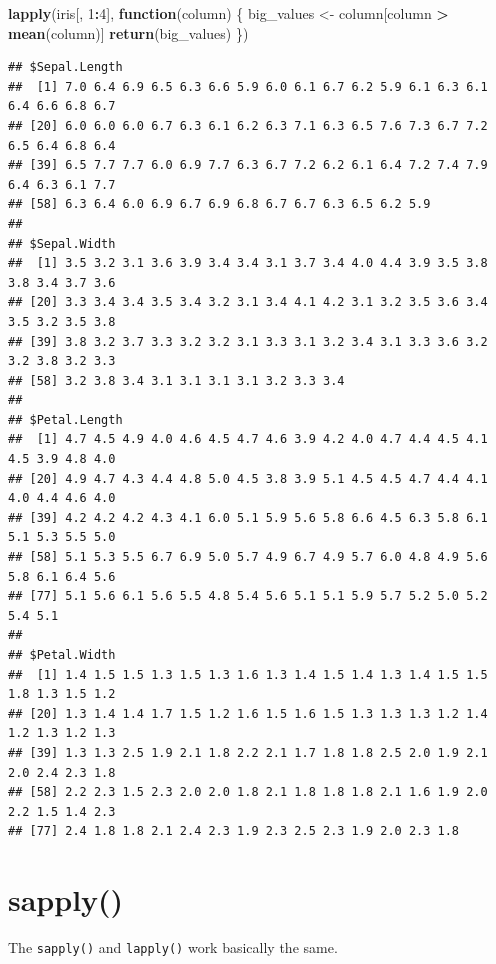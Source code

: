 \documentclass[
]{book}
\newenvironment{Shaded}{\begin{snugshade}}{\end{snugshade}}
\newcommand{\ControlFlowTok}[1]{\textcolor[rgb]{0.13,0.29,0.53}{\textbf{#1}}}
\newcommand{\DecValTok}[1]{\textcolor[rgb]{0.00,0.00,0.81}{#1}}
\newcommand{\KeywordTok}[1]{\textcolor[rgb]{0.13,0.29,0.53}{\textbf{#1}}}
\newcommand{\NormalTok}[1]{#1}
\newcommand{\OperatorTok}[1]{\textcolor[rgb]{0.81,0.36,0.00}{\textbf{#1}}}
\newcommand{\StringTok}[1]{\textcolor[rgb]{0.31,0.60,0.02}{#1}}
\begin{document}
\begin{Shaded}
\begin{Highlighting}[]
\KeywordTok{lapply}\NormalTok{(iris[, }\DecValTok{1}\OperatorTok{:}\DecValTok{4}\NormalTok{], }\ControlFlowTok{function}\NormalTok{(column) \{}
\NormalTok{    big_values <-}\StringTok{ }\NormalTok{column[column }\OperatorTok{>}\StringTok{ }\KeywordTok{mean}\NormalTok{(column)]}
    \KeywordTok{return}\NormalTok{(big_values)}
\NormalTok{\})}
\end{Highlighting}
\end{Shaded}

\begin{verbatim}
## $Sepal.Length
##  [1] 7.0 6.4 6.9 6.5 6.3 6.6 5.9 6.0 6.1 6.7 6.2 5.9 6.1 6.3 6.1 6.4 6.6 6.8 6.7
## [20] 6.0 6.0 6.0 6.7 6.3 6.1 6.2 6.3 7.1 6.3 6.5 7.6 7.3 6.7 7.2 6.5 6.4 6.8 6.4
## [39] 6.5 7.7 7.7 6.0 6.9 7.7 6.3 6.7 7.2 6.2 6.1 6.4 7.2 7.4 7.9 6.4 6.3 6.1 7.7
## [58] 6.3 6.4 6.0 6.9 6.7 6.9 6.8 6.7 6.7 6.3 6.5 6.2 5.9
## 
## $Sepal.Width
##  [1] 3.5 3.2 3.1 3.6 3.9 3.4 3.4 3.1 3.7 3.4 4.0 4.4 3.9 3.5 3.8 3.8 3.4 3.7 3.6
## [20] 3.3 3.4 3.4 3.5 3.4 3.2 3.1 3.4 4.1 4.2 3.1 3.2 3.5 3.6 3.4 3.5 3.2 3.5 3.8
## [39] 3.8 3.2 3.7 3.3 3.2 3.2 3.1 3.3 3.1 3.2 3.4 3.1 3.3 3.6 3.2 3.2 3.8 3.2 3.3
## [58] 3.2 3.8 3.4 3.1 3.1 3.1 3.1 3.2 3.3 3.4
## 
## $Petal.Length
##  [1] 4.7 4.5 4.9 4.0 4.6 4.5 4.7 4.6 3.9 4.2 4.0 4.7 4.4 4.5 4.1 4.5 3.9 4.8 4.0
## [20] 4.9 4.7 4.3 4.4 4.8 5.0 4.5 3.8 3.9 5.1 4.5 4.5 4.7 4.4 4.1 4.0 4.4 4.6 4.0
## [39] 4.2 4.2 4.2 4.3 4.1 6.0 5.1 5.9 5.6 5.8 6.6 4.5 6.3 5.8 6.1 5.1 5.3 5.5 5.0
## [58] 5.1 5.3 5.5 6.7 6.9 5.0 5.7 4.9 6.7 4.9 5.7 6.0 4.8 4.9 5.6 5.8 6.1 6.4 5.6
## [77] 5.1 5.6 6.1 5.6 5.5 4.8 5.4 5.6 5.1 5.1 5.9 5.7 5.2 5.0 5.2 5.4 5.1
## 
## $Petal.Width
##  [1] 1.4 1.5 1.5 1.3 1.5 1.3 1.6 1.3 1.4 1.5 1.4 1.3 1.4 1.5 1.5 1.8 1.3 1.5 1.2
## [20] 1.3 1.4 1.4 1.7 1.5 1.2 1.6 1.5 1.6 1.5 1.3 1.3 1.3 1.2 1.4 1.2 1.3 1.2 1.3
## [39] 1.3 1.3 2.5 1.9 2.1 1.8 2.2 2.1 1.7 1.8 1.8 2.5 2.0 1.9 2.1 2.0 2.4 2.3 1.8
## [58] 2.2 2.3 1.5 2.3 2.0 2.0 1.8 2.1 1.8 1.8 1.8 2.1 1.6 1.9 2.0 2.2 1.5 1.4 2.3
## [77] 2.4 1.8 1.8 2.1 2.4 2.3 1.9 2.3 2.5 2.3 1.9 2.0 2.3 1.8
\end{verbatim}

\hypertarget{sapply}{%
\section{sapply()}\label{sapply}}

The \texttt{sapply()} and \texttt{lapply()} work basically the same.
\end{document}
